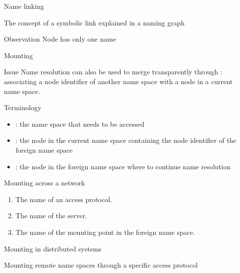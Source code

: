 \begin{slide}{Name linking}
  \begin{block}{The concept of a symbolic link explained in a naming graph}
    \begin{center}
    \end{center}
  \end{block}
  \begin{alertblock}{Observation} 
    Node  has only one name
  \end{alertblock}
\end{slide}
\begin{slide}{Mounting}
  \begin{block}{Issue}
    Name resolution can also be used to merge  transparently through
    : associating a node identifier of another name space with a node in a current name space.
  \end{block}
  \begin{block}{Terminology}
    \begin{itemize}\tightlist
    \item {}: the name space that needs to be accessed
    \item {}: the node in the current name space containing the node identifier of the foreign
      name space
    \item {}: the node in the foreign name space where to continue name resolution
    \end{itemize}
  \end{block}
  \begin{block}{Mounting across a network}
    \begin{enumerate}\tightlist
    \item The name of an access protocol.
    \item The name of the server.
    \item The name of the mounting point in the foreign name space.
    \end{enumerate}
  \end{block}
\end{slide}
\begin{slide}{Mounting in distributed systems}
  \vspace*{-6pt}
  \begin{block}{Mounting remote name spaces through a specific access protocol}
    \begin{center}
    \end{center}
  \end{block}
\end{slide}

